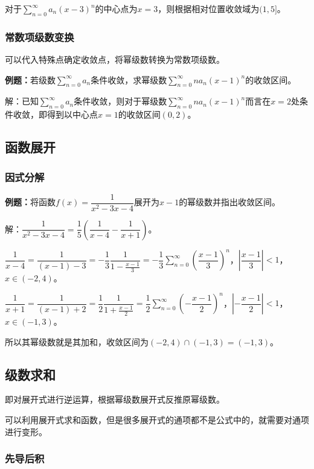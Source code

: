 \documentclass[UTF8, 12pt]{ctexart}
\begin{document}
对于$\sum\limits_{n=0}^\infty a_n(x-3)^n$的中心点为$x=3$，则根据相对位置收敛域为$(1,5]$。

\subsubsection{常数项级数变换}

可以代入特殊点确定收敛点，将幂级数转换为常数项级数。

\textbf{例题：}若级数$\sum\limits_{n=0}^\infty a_n$条件收敛，求幂级数$\sum\limits_{n=0}^\infty na_n(x-1)^n$的收敛区间。

解：已知$\sum\limits_{n=0}^\infty a_n$条件收敛，则对于幂级数$\sum\limits_{n=0}^\infty na_n(x-1)^n$而言在$x=2$处条件收敛，即得到以中心点$x=1$的收敛区间$(0,2)$。

\subsection{函数展开}

\subsubsection{因式分解}

\textbf{例题：}将函数$f(x)=\dfrac{1}{x^2-3x-4}$展开为$x-1$的幂级数并指出收敛区间。

解：$\dfrac{1}{x^2-3x-4}=\dfrac{1}{5}\left(\dfrac{1}{x-4}-\dfrac{1}{x+1}\right)$。

$\dfrac{1}{x-4}=\dfrac{1}{(x-1)-3}=-\dfrac{1}{3}\dfrac{1}{1-\frac{x-1}{3}}=-\dfrac{1}{3}\sum\limits_{n=0}^\infty\left(\dfrac{x-1}{3}\right)^n$，$\left\vert\dfrac{x-1}{3}\right\vert<1$，$x\in(-2,4)$。

$\dfrac{1}{x+1}=\dfrac{1}{(x-1)+2}=\dfrac{1}{2}\dfrac{1}{1+\frac{x-1}{2}}=\dfrac{1}{2}\sum\limits_{n=0}^\infty\left(-\dfrac{x-1}{2}\right)^n$，$\left\vert-\dfrac{x-1}{2}\right\vert<1$，$x\in(-1,3)$。

所以其幂级数就是其加和，收敛区间为$(-2,4)\cap(-1,3)=(-1,3)$。

\subsection{级数求和}

即对展开式进行逆运算，根据幂级数展开式反推原幂级数。

可以利用展开式求和函数，但是很多展开式的通项都不是公式中的，就需要对通项进行变形。

\subsubsection{先导后积}
\end{document}
